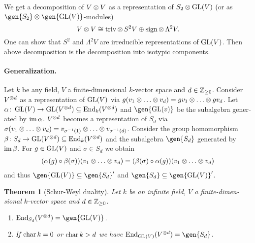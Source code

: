 \documentclass[12pt,a4paper]{scrartcl}
\theoremstyle{cplain}
\theoremstyle{cplain}
\newtheorem{thm}[thmcounter]{Theorem}
\theoremstyle{cplain}
\theoremstyle{definition}
\begin{document}
\begin{otherlanguage}{english}
We get a decomposition of $V\otimes V$ as a representation of $S_2 \otimes \operatorname{GL}(V)$ (or as $\gen{S_2}\tp \gen{\GL(V)}$-modules) \[ V\otimes V \cong \operatorname{triv} \otimes\, S^2V \oplus \operatorname{sign} \otimes\, \Lambda^2V. \] One can show that $S^2$ and $\Lambda^2V$ are irreducible representations of $\operatorname{GL}(V)$. Then above decomposition is the decomposition into isotypic components.

\paragraph{Generalization.}
Let $k$ be any field, $V$ a finite-dimensional $k$-vector space and $d\in\mathbb Z_{\ge0}$. Consider $V^{\otimes d}$ as a representation of $\operatorname{GL}(V)$ via $g(v_1\otimes\ldots\otimes v_d) = gv_1\otimes \ldots \otimes gv_d$. Let $\alpha\colon \operatorname{GL}(V) \to \operatorname{GL}(V^{\otimes d}) \subseteq \operatorname{End}_k(V^{\otimes d})$ and $\gen{\GL(v)}$ be the subalgebra generated by $\operatorname{im}\alpha$. $V^{\otimes d}$ becomes a representation of $S_d$ via $\sigma(v_1\otimes \ldots\otimes v_d) = v_{\sigma^{-1}(1)}\otimes \ldots\otimes v_{\sigma^{-1}(d)}$. Consider the group homomorphism $\beta\colon S_d \to \operatorname{GL}(V^{\otimes d}) \subseteq \operatorname{End}_k(V^{\otimes d})$ and the subalgebra $\gen{S_d}$ generated by $\operatorname{im}\beta$. For $g\in \operatorname{GL}(V)$ and $\sigma\in S_d$ we obtain
\begin{align*}
  (\alpha(g) \circ \beta(\sigma))(v_1\otimes \ldots\otimes v_d) = (\beta(\sigma) \circ \alpha(g))(v_1\otimes \ldots\otimes v_d)
\end{align*}
and thus $\gen{\GL(V)} \subseteq \gen{S_d}'$ and $\gen{S_d}\subseteq \gen{\GL(V)}'$.

\begin{thm}[Schur-Weyl duality]
  Let $k$ be an infinite field, $V$ a finite-dimensional $k$-vector space and $d\in\mathbb Z_{\ge0}$.
  \begin{enumerate}
    \item $\End_{S_d}(V^{\tp d}) = \gen{\GL(V)}$.
    \item If $\operatorname{char} k = 0$ or $\operatorname{char} k > d$ we have $\End_{\GL(V)}(V^{\tp d}) =\gen{S_d}$.
  \end{enumerate}
\end{thm}





\end{otherlanguage}
\end{document}
